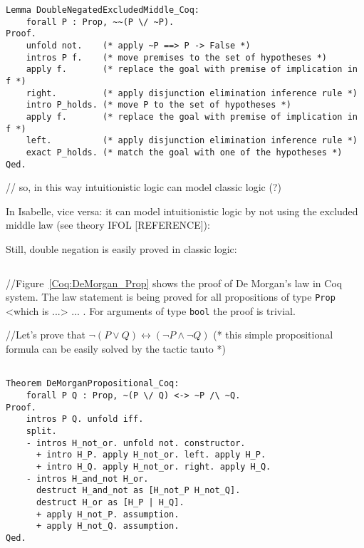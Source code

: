 \documentclass[article]{aaltoseries}
\begin{document}
\begin{lstlisting}[language=coq]
Lemma DoubleNegatedExcludedMiddle_Coq:
    forall P : Prop, ~~(P \/ ~P).
Proof.
    unfold not.    (* apply ~P ==> P -> False *)
    intros P f.    (* move premises to the set of hypotheses *)
    apply f.       (* replace the goal with premise of implication in f *)
    right.         (* apply disjunction elimination inference rule *)
    intro P_holds. (* move P to the set of hypotheses *)
    apply f.       (* replace the goal with premise of implication in f *)
    left.          (* apply disjunction elimination inference rule *)
    exact P_holds. (* match the goal with one of the hypotheses *)
Qed.
\end{lstlisting}

// so, in this way intuitionistic logic can model classic logic (?)

In Isabelle, vice versa: it can model intuitionistic logic by not using the excluded middle law (see theory IFOL [REFERENCE]):  %

Still, double negation is easily proved in classic logic:
\begin{lstlisting}[language=isabelle]
\end{lstlisting}


//Figure~\ref{Coq:DeMorgan_Prop} shows the proof of De Morgan's law in Coq system. The law statement is being proved for all propositions of type \texttt{Prop}  <which is ...> ... . For arguments of type \texttt{bool} the proof is trivial.

//Let's prove that $\neg (P \lor Q) \leftrightarrow (\neg P \land \neg Q)$
    (* this simple propositional formula can be easily solved by the tactic tauto *)
    
\begin{lstlisting}[language=coq,caption={Proof of propositional logic tautology in Coq: the de Morgan's law for propositions},label={DeMorganPropositional_Coq}]

Theorem DeMorganPropositional_Coq:
    forall P Q : Prop, ~(P \/ Q) <-> ~P /\ ~Q.
Proof.
    intros P Q. unfold iff.
    split.
    - intros H_not_or. unfold not. constructor.
      + intro H_P. apply H_not_or. left. apply H_P.
      + intro H_Q. apply H_not_or. right. apply H_Q.
    - intros H_and_not H_or.
      destruct H_and_not as [H_not_P H_not_Q].
      destruct H_or as [H_P | H_Q].
      + apply H_not_P. assumption.
      + apply H_not_Q. assumption.
Qed.
\end{lstlisting}
\end{document}
